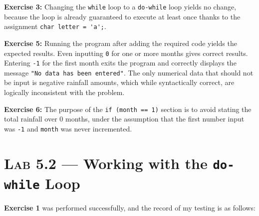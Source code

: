 \documentclass[11pt]{article}
\begin{document}
	\textbf{Exercise 3:} Changing the \lstinline{while} loop to a \lstinline{do-while} loop yields no change, because the loop is already guaranteed to execute at least once thanks to the assignment \lstinline{char letter = 'a';}.
	
	\textbf{Exercise 5:} Running the program after adding the required code yields the expected results. Even inputting \lstinline{0} for one or more months gives correct results. Entering \lstinline{-1} for the first month exits the program and correctly displays the message \lstinline{"No data has been entered"}. The only numerical data that should not be input is negative rainfall amounts, which while syntactically correct, are logically inconsistent with the problem.
	
	\textbf{Exercise 6:} The purpose of the \lstinline{if (month == 1)} section is to avoid stating the total rainfall over 0 months, under the assumption that the first number input was \lstinline{-1} and \lstinline{month} was never incremented.


\section*{\textsc{Lab 5.2} --- Working with the \texttt{do-while} Loop}

	\textbf{Exercise 1} was performed successfully, and the record of my testing is as follows:
	
\end{document}

